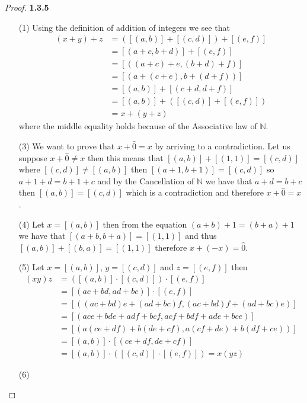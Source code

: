 \documentclass[11pt]{article}
\newcommand{\N}{\mathbb{N}}
\theoremstyle{definition}
\begin{document}
    \begin{proof}{\textbf{1.3.5}}
    \begin{itemize}
    \item [(1)]
    Using the definition of addition of integers we see that
    \begin{align*}
        (x+y)+z &= ([(a,b)]+[(c,d)])+[(e,f)] \\
                &= [(a+c,b+d)] + [(e,f)] \\
                &= [((a+c)+e,(b+d)+f)] \\
                &= [(a+(c+e),b+(d+f))] \\
                &= [(a,b)] + [(c+d,d+f)] \\
                &= [(a,b)] + ([(c,d)] + [(e,f)]) \\
                &= x+(y+z)
    \end{align*}
    where the middle equality holds because of the Associative law of $\N$.
    \item [(3)]
    We want to prove that $x+\hat{0} = x$ by arriving to a contradiction. Let us suppose
    $x + \hat{0} \neq x$ then this means that $[(a,b)]+[(1,1)] = [(c,d)]$ where
    $[(c,d)] \neq [(a,b)]$ then $[(a+1,b+1)] = [(c,d)]$ so $a+1+d=b+1+c$ and by the
    Cancellation of $\N$ we have that $a+d=b+c$ then $[(a,b)]=[(c,d)]$ which is a
    contradiction and therefore $x+\hat{0} = x$.
    \item [(4)]
    Let $x=[(a,b)]$ then from the equation $(a+b)+1=(b+a)+1$ we have that
    $[(a+b,b+a)]=[(1,1)]$ and thus $[(a,b)]+[(b,a)] = [(1,1)]$ therefore $x+(-x)=\hat{0}$. 
    \item [(5)]
    Let $x = [(a,b)]$, $y = [(c,d)]$ and $z = [(e,f)]$ then
    \begin{align*}
        (xy)z &= ([(a,b)]\cdot[(c,d)])\cdot[(e,f)] \\
              &= [(ac + bd,ad + bc)] \cdot[(e,f)] \\
              &= [((ac + bd)e+(ad + bc)f, (ac + bd)f+(ad + bc)e)] \\
              &= [(ace + bde+adf + bcf, acf + bdf+ ade + bce)] \\
              &= [(a(ce + df) + b(de + cf), a(cf + de) + b(df + ce))] \\
              &= [(a,b)] \cdot [(ce + df, de + cf)] \\
              &= [(a,b)] \cdot ([(c,d)] \cdot [(e,f)]) = x(yz)
    \end{align*}
    \item [(6)]

\end{itemize}
\end{proof}
\end{document}
